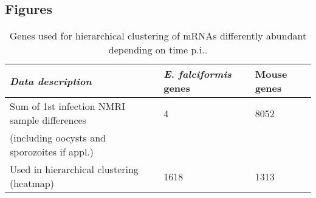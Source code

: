 \documentclass{bmcart}
\begin{document}
\begin{backmatter}



\section*{Figures}






\setlength{\tabcolsep}{10pt}
\begin{table}[H]
\small
\begin{center}
\caption{Genes used for hierarchical clustering of mRNAs differently abundant depending on time p.i..}
\begin{tabular}{*3l}    \toprule
	\textit{Data description} & \emph{E. falciformis} genes & Mouse genes	\\ \midrule
	Sum of 1st infection NMRI sample differences	& 4 & 8052 \\ 
	(including oocysts and sporozoites if appl.)	\\	
	Used in hierarchical clustering (heatmap)  	& 1618 & 1313 \\ 	\bottomrule	
\hline
\end{tabular}
\end{center}
\end{table}




\newcommand{\bcell}[2][c]{%
  \begin{tabular}[#1]{@{}c@{}}#2\end{tabular}}


\end{backmatter}
\end{document}
